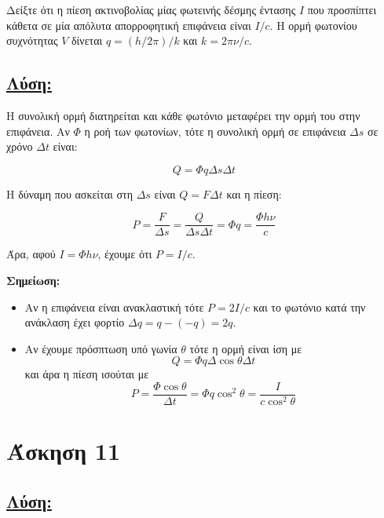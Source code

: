 \documentclass[a4paper,11pt,titlepage]{article}
\begin{document}
Δείξτε ότι η πίεση ακτινοβολίας μίας φωτεινής δέσμης έντασης $I$ που προσπίπτει κάθετα σε μία απόλυτα απορροφητική επιφάνεια είναι $I/c$. Η ορμή φωτονίου συχνότητας $V$ δίνεται $q=(h/2\pi)/k$ και $k=2\pi\nu/c$.

\subsection*{\underline{Λύση:}}

Η συνολική ορμή διατηρείται και κάθε φωτόνιο μεταφέρει την ορμή του στην επιφάνεια. Αν $\Phi$ η ροή των φωτονίων, τότε η συνολική ορμή σε επιφάνεια ${\Delta}s$ σε χρόνο $\Delta t$ είναι:

\begin{equation}
 Q=\Phi q\Delta s\Delta t
\end{equation}

Η δύναμη που ασκείται στη $\Delta s$ είναι $Q=F\Delta t$ και η πίεση:

\begin{equation}
 P=\dfrac{F}{\Delta s}=\dfrac{Q}{\Delta s\Delta t}=\Phi q=\dfrac{\Phi h\nu}{c}
\end{equation}

Άρα, αφού $I=\Phi h\nu$, έχουμε ότι $P=I/c$.

\textbf{Σημείωση:}
\begin{itemize}
 \item Αν η επιφάνεια είναι ανακλαστική τότε $P=2I/c$ και το φωτόνιο κατά την ανάκλαση έχει φορτίο $\Delta q=q-(-q)=2q$.
 \item Αν έχουμε πρόσπτωση υπό γωνία $\theta$ τότε η ορμή είναι ίση με 
\begin{equation}
Q=\Phi q\Delta \cos\theta \Delta t 
\end{equation}
και άρα η πίεση ισούται με
\begin{equation}
 P=\dfrac{\Phi \cos\theta}{\Delta t}=\Phi q\cos^2\theta=\dfrac{I}{c\cos^2\theta}
\end{equation}


\end{itemize}


\section{Άσκηση 11} 



\subsection*{\underline{Λύση:}}
\end{document}
